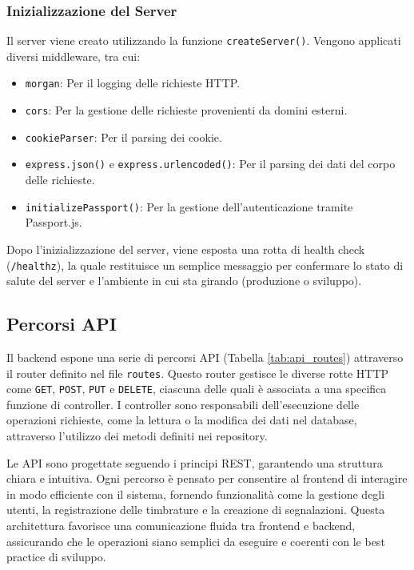 \documentclass[twoside]{supsistudent}
\begin{document}
\subsubsection{Inizializzazione del Server}
Il server viene creato utilizzando la funzione \texttt{createServer()}. Vengono applicati diversi middleware, tra cui:
\begin{itemize}
  \item \texttt{morgan}: Per il logging delle richieste HTTP.
  \item \texttt{cors}: Per la gestione delle richieste provenienti da domini esterni.
  \item \texttt{cookieParser}: Per il parsing dei cookie.
  \item \texttt{express.json()} e \texttt{express.urlencoded()}: Per il parsing dei dati del corpo delle richieste.
  \item \texttt{initializePassport()}: Per la gestione dell'autenticazione tramite Passport.js.
\end{itemize}
Dopo l'inizializzazione del server, viene esposta una rotta di health check (\texttt{/healthz}), la quale restituisce un semplice messaggio per confermare lo stato di salute del server e l'ambiente in cui sta girando (produzione o sviluppo).

\subsection{Percorsi API}

Il backend espone una serie di percorsi API (Tabella \ref{tab:api_routes}) attraverso il router definito nel file \texttt{routes}. Questo router gestisce le diverse rotte HTTP come \texttt{GET}, \texttt{POST}, \texttt{PUT} e \texttt{DELETE}, ciascuna delle quali è associata a una specifica funzione di controller. I controller sono responsabili dell'esecuzione delle operazioni richieste, come la lettura o la modifica dei dati nel database, attraverso l'utilizzo dei metodi definiti nei repository.

Le API sono progettate seguendo i principi REST, garantendo una struttura chiara e intuitiva. Ogni percorso è pensato per consentire al frontend di interagire in modo efficiente con il sistema, fornendo funzionalità come la gestione degli utenti, la registrazione delle timbrature e la creazione di segnalazioni. Questa architettura favorisce una comunicazione fluida tra frontend e backend, assicurando che le operazioni siano semplici da eseguire e coerenti con le best practice di sviluppo.
\end{document}
